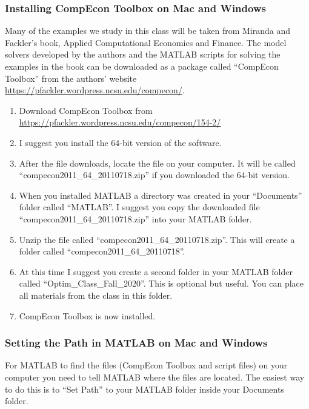 \documentclass[
]{article}
\begin{document}
\hypertarget{installing-compecon-toolbox-on-mac-and-windows}{%
\subsubsection{Installing CompEcon Toolbox on Mac and
Windows}\label{installing-compecon-toolbox-on-mac-and-windows}}

Many of the examples we study in this class will be taken from Miranda
and Fackler's book, Applied Computational Economics and Finance. The
model solvers developed by the authors and the MATLAB scripts for
solving the examples in the book can be downloaded as a package called
``CompEcon Toolbox'' from the authors' website
\url{https://pfackler.wordpress.ncsu.edu/compecon/}.

\begin{enumerate}
\def\labelenumi{\arabic{enumi}.}
\item
  Download CompEcon Toolbox from
  \url{https://pfackler.wordpress.ncsu.edu/compecon/154-2/}
\item
  I suggest you install the 64-bit version of the software.
\item
  After the file downloads, locate the file on your computer. It will be
  called ``compecon2011\_64\_20110718.zip'' if you downloaded the 64-bit
  version.
\item
  When you installed MATLAB a directory was created in your
  ``Documents'' folder called ``MATLAB''. I suggest you copy the
  downloaded file ``compecon2011\_64\_20110718.zip'' into your MATLAB
  folder.
\item
  Unzip the file called ``compecon2011\_64\_20110718.zip''. This will
  create a folder called ``compecon2011\_64\_20110718''.
\item
  At this time I suggest you create a second folder in your MATLAB
  folder called ``Optim\_Class\_Fall\_2020''. This is optional but
  useful. You can place all materials from the class in this folder.
\item
  CompEcon Toolbox is now installed.
\end{enumerate}

\hypertarget{setting-the-path-in-matlab-on-mac-and-windows}{%
\subsubsection{Setting the Path in MATLAB on Mac and
Windows}\label{setting-the-path-in-matlab-on-mac-and-windows}}

For MATLAB to find the files (CompEcon Toolbox and script files) on your
computer you need to tell MATLAB where the files are located. The
easiest way to do this is to ``Set Path'' to your MATLAB folder inside
your Documents folder.
\end{document}
